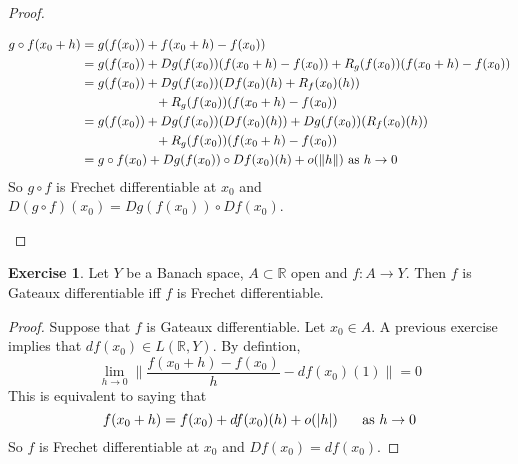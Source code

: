 \documentclass[12pt]{amsart}
\theoremstyle{definition}
\newtheorem{ex}[definition]{Exercise}
\newcommand{\R}{\mathbb{R}}
\newcommand{\lex}[1]{\label{ex:#1}}
\begin{document}
\begin{proof}
\begin{itemize}
\begin{align*}
	g \circ f(x_0 + h) 
	&=  g (f(x_0)) + f(x_0 + h) - f(x_0)) \\
	&= g(f(x_0)) + Dg(f(x_0))(f(x_0 + h) - f(x_0)) + R_g(f(x_0))(f(x_0 + h) - f(x_0)) \\
	&= g(f(x_0)) + Dg(f(x_0))(Df(x_0)(h) + R_f(x_0)(h)) \\
	& \hspace{2.05cm} +  R_g(f(x_0))(f(x_0 + h) - f(x_0)) \\
	&= g(f(x_0)) + Dg(f(x_0))(Df(x_0)(h)) + Dg(f(x_0))(R_f(x_0)(h)) \\
	& \hspace{2.05cm} +  R_g(f(x_0))(f(x_0 + h) - f(x_0)) \\
	&= g \circ f(x_0) + Dg(f(x_0)) \circ Df(x_0)(h) + o(\|h\|) \text{ as } h \rightarrow 0
	\end{align*}
	So $g \circ f$ is Frechet differentiable at $x_0$ and $D(g \circ f)(x_0) = Dg(f(x_0)) \circ Df(x_0)$.
	\end{itemize}
	\end{proof}
	
	\begin{ex} \lex{62010}
	Let $Y$ be a Banach space, $A \subset \R$ open and $f:A \rightarrow Y$. Then $f$ is Gateaux differentiable iff $f$ is Frechet differentiable.
	\end{ex}
	
	\begin{proof}
	Suppose that $f$ is Gateaux differentiable. Let $x_0 \in A$. A previous exercise implies that $df(x_0) \in L(\R, Y)$. By defintion, $$  \lim_{h \rightarrow 0} \bigg \| \frac{f(x_0 + h) - f(x_0)}{h} - df(x_0)(1) \bigg \| = 0$$ 
	This is equivalent to saying that $$f(x_0 + h) = f(x_0) + df(x_0)(h) + o(|h|) \hspace{.5cm} \text{ as } h \rightarrow 0$$
	So $f$ is Frechet differentiable at $x_0$ and $Df(x_0) = df(x_0)$.
	\end{proof}
	
	
	
	
	
	
	
	
	\newpage
\end{document}
